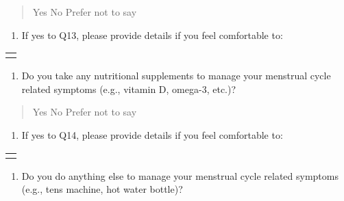\begin{quote}
Yes No Prefer not to say
\end{quote}

\begin{enumerate}
\def\labelenumi{\alph{enumi}.}
\item
  If yes to Q13, please provide details if you feel comfortable to:
\end{enumerate}

\begin{longtable}[]{@{}
  >{\raggedright\arraybackslash}p{}@{}}
\toprule\noalign{}
\begin{minipage}[b]{\linewidth}\raggedright
\end{minipage} \\
\midrule\noalign{}
\endhead
\bottomrule\noalign{}
\endlastfoot
\end{longtable}

\begin{enumerate}
\def\labelenumi{\arabic{enumi})}
\setcounter{enumi}{14}
\item
  Do you take any nutritional supplements to manage your menstrual cycle
  related symptoms (e.g., vitamin D, omega-3, etc.)?
\end{enumerate}

\begin{quote}
Yes No Prefer not to say
\end{quote}

\begin{enumerate}
\def\labelenumi{\alph{enumi}.}
\item
  If yes to Q14, please provide details if you feel comfortable to:
\end{enumerate}

\begin{longtable}[]{@{}
  >{\raggedright\arraybackslash}p{}@{}}
\toprule\noalign{}
\begin{minipage}[b]{\linewidth}\raggedright
\end{minipage} \\
\midrule\noalign{}
\endhead
\bottomrule\noalign{}
\endlastfoot
\end{longtable}

\begin{enumerate}
\def\labelenumi{\arabic{enumi})}
\setcounter{enumi}{15}
\item
  Do you do anything else to manage your menstrual cycle related
  symptoms (e.g., tens machine, hot water bottle)?
\end{enumerate}

